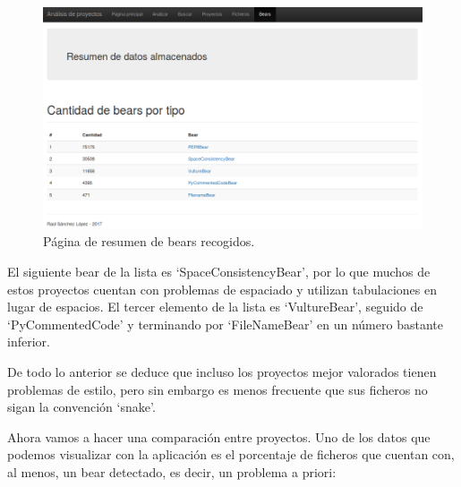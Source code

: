 \documentclass[a4paper, 12pt]{book}
\begin{document}
\begin{figure}[H]
  \centering
  \includegraphics[width=15cm, keepaspectratio]{img/resultadosBear}
  \caption{Página de resumen de bears recogidos.}
  \label{fig:resultadosBear}
\end{figure}

El siguiente bear de la lista es `SpaceConsistencyBear', por lo que muchos de estos proyectos cuentan con problemas de espaciado y utilizan tabulaciones en lugar de espacios. El tercer elemento de la lista es `VultureBear', seguido de `PyCommentedCode' y terminando por `FileNameBear' en un número bastante inferior.

De todo lo anterior se deduce que incluso los proyectos mejor valorados tienen problemas de estilo, pero sin embargo es menos frecuente que sus ficheros no sigan la convención `snake'.

Ahora vamos a hacer una comparación entre proyectos. Uno de los datos que podemos visualizar con la aplicación es el porcentaje de ficheros que cuentan con, al menos, un bear detectado, es decir, un problema a priori:
\end{document}
